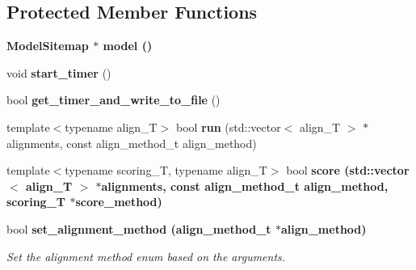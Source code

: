 \subsection*{Protected Member Functions}
\begin{CompactItemize}
\item 
\bf{Model\-Sitemap} $\ast$ \textbf{model} ()\label{classSimSite3D_1_1Search_8943627120b7578d1d37ad37c319e5b9}

\item 
void \textbf{start\_\-timer} ()\label{classSimSite3D_1_1Search_5bb9e31b72d314730373b33c2a602cc4}

\item 
bool \textbf{get\_\-timer\_\-and\_\-write\_\-to\_\-file} ()\label{classSimSite3D_1_1Search_54f6cd281b8ba0c9760a57c6d1b7f2c1}

\item 
template$<$typename align\_\-T$>$ bool \textbf{run} (std::vector$<$ align\_\-T $>$ $\ast$alignments, const align\_\-method\_\-t align\_\-method)\label{classSimSite3D_1_1Search_221ce8b930daf65916a915436fc44254}

\item 
template$<$typename scoring\_\-T, typename align\_\-T$>$ bool \bf{score} (std::vector$<$ align\_\-T $>$ $\ast$alignments, const align\_\-method\_\-t align\_\-method, scoring\_\-T $\ast$score\_\-method)
\item 
bool \bf{set\_\-alignment\_\-method} (align\_\-method\_\-t $\ast$align\_\-method)\label{classSimSite3D_1_1Search_8d8972c7e6cab00f3251285af696d902}

\begin{CompactList}\small\item\em Set the alignment method enum based on the arguments. \item\end{CompactList}\end{CompactItemize}
